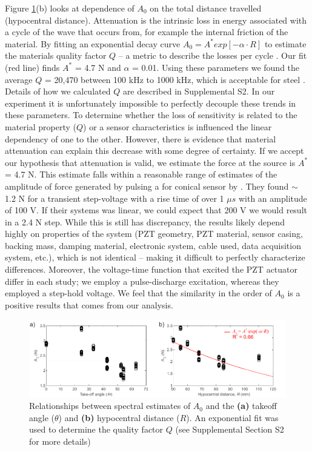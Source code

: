 \documentclass[preprint,3p, 11pt,authoryear]{elsarticle}
\begin{document}
Figure \ref{fig9a}(b) looks at dependence of $A_{0}$ on the total distance travelled (hypocentral distance). Attenuation is the intrinsic loss in energy associated with a cycle of the wave that occurs from, for example the internal friction of the material.  By fitting an exponential decay curve $A_{0} = A^{*}exp[-\alpha\cdot R]$ to estimate the materials quality factor $Q$ -- a metric to describe the losses per cycle \citep{Barton2007}. Our fit (red line) finds $A^{*}$ = 4.7 N and $\alpha$ = 0.01. Using these parameters we found the average $Q$ = 20,470 between 100 kHz to 1000 kHz, which is acceptable for steel \citep{citation}. Details of how we calculated $Q$ are described in Supplemental S2. In our experiment it is unfortunately impossible to perfectly decouple these trends in these parameters. To determine whether the loss of sensitivity is related to the material property ($Q$) or a sensor characteristics is influenced the linear dependency of one to the other. However, there is evidence that material attenuation can explain this decrease with some degree of certainty. If we accept our hypothesis that attenuation is valid, we estimate the force at the source is $A^{*}$ = 4.7 N. This estimate falls within a reasonable range of estimates of the amplitude of force generated by pulsing a for conical sensor by \citet{Breckenridge1990}. They found $\sim $ 1.2 N for a transient step-voltage with a rise time of over 1 $\mu s$ with an amplitude of 100 V. If their systems was linear, we could expect that 200 V we would result in a 2.4 N step.  While this is still has discrepancy, the results likely depend highly on properties of the system (PZT geometry, PZT material, sensor casing, backing mass, damping material, electronic system, cable used, data acquisition system, etc.), which is not identical -- making it difficult to perfectly characterize differences. Moreover, the voltage-time function that excited the PZT actuator differ in each study; we employ a pulse-discharge excitation, whereas they employed a step-hold voltage. We feel that the similarity in the order of $A_{0}$ is a positive results that comes from our analysis. 

\begin{figure}[ht]
     	\centering
\includegraphics[scale= 1]{FIG9a.pdf} 
\caption{Relationships between spectral estimates of $A_{0}$ and the \textbf{(a)} takeoff angle ($\theta$) and \textbf{(b)} hypocentral distance ($R$). An exponential fit was used to determine the quality factor $Q$ (see Supplemental Section S2 for more details)  }
	\label{fig9a} 
\end{figure}
\end{document}
